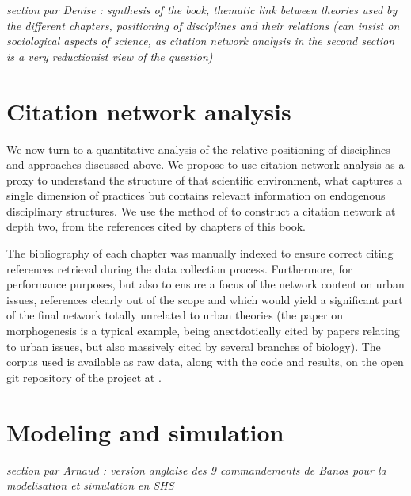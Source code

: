 \textit{section par Denise : synthesis of the book, thematic link between theories used by the different chapters, positioning of disciplines and their relations (can insist on sociological aspects of science, as citation network analysis in the second section is a very reductionist view of the question)}



\section{Citation network analysis}

We now turn to a quantitative analysis of the relative positioning of disciplines and approaches discussed above. We propose to use citation network analysis as a proxy to understand the structure of that scientific environment, what captures a single dimension of practices but contains relevant information on endogenous disciplinary structures. We use the method of \cite{Raimbault2019} to construct a citation network at depth two, from the references cited by chapters of this book.

The bibliography of each chapter was manually indexed to ensure correct citing references retrieval during the data collection process. Furthermore, for performance purposes, but also to ensure a focus of the network content on urban issues, references clearly out of the scope and which would yield a significant part of the final network totally unrelated to urban theories (the paper on morphogenesis \cite{turing1990chemical} is a typical example, being anectdotically cited by papers relating to urban issues, but also massively cited by several branches of biology). The corpus used is available as raw data, along with the code and results, on the open git repository of the project at \url{}.





\section{Modeling and simulation}

\textit{section par Arnaud : version anglaise des 9 commandements de Banos pour la modelisation et simulation en SHS}






